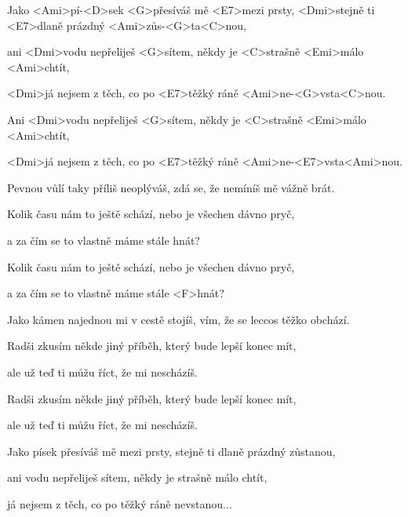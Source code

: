 

\zs
Jako <Ami>pí-<D>sek <G>přesíváš mě <E7>mezi prsty,
<Dmi>stejně ti <E7>dlaně prázdný <Ami>zůs-<G>ta<C>nou, 

ani <Dmi>vodu nepřeliješ <G>sítem,
někdy je <C>strašně <Emi>málo <Ami>chtít,

<Dmi>já nejsem z těch, co po <E7>těžký ráně
<Ami>ne-<G>vsta<C>nou.

Ani <Dmi>vodu nepřeliješ <G>sítem,
někdy je <C>strašně <Emi>málo <Ami>chtít, 

<Dmi>já nejsem z těch, co po <E7>těžký ráně
<Ami>ne-<E7>vsta<Ami>nou. \ks

\zs
Pevnou vůlí taky příliš neoplýváš, zdá se, že nemíníš mě vážně brát. 

Kolik času nám to ještě schází, nebo je všechen dávno pryč, 

a za čím se to vlastně máme stále hnát? 

Kolik času nám to ještě schází, nebo je všechen dávno pryč, 

a za čím se to vlastně máme stále <F>hnát? 
\ks

\zs
Jako kámen najednou mi v cestě stojíš, vím, že se leccos těžko obchází. 

Radši zkusím někde jiný příběh, který bude lepší konec mít, 

ale už teď ti můžu říct, že mi nescházíš. 

Radši zkusím někde jiný příběh, který bude lepší konec mít, 

ale už teď ti můžu říct, že mi nescházíš. 
\ks

\zs
Jako písek přesíváš mě mezi prsty, stejně ti dlaně prázdný zůstanou, 

ani vodu nepřeliješ sítem, někdy je strašně málo chtít, 

já nejsem z těch, co po těžký ráně nevstanou...
\ks

\kp

